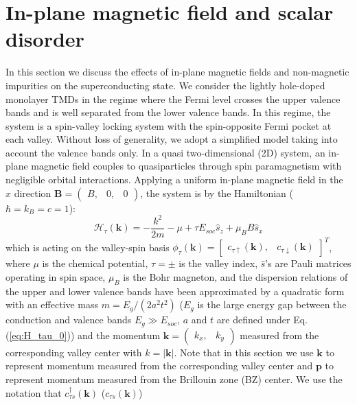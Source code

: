 \section{In-plane magnetic field and scalar disorder}

In this section we discuss the effects of in-plane magnetic fields
and non-magnetic impurities on the superconducting state. We consider
the lightly hole-doped monolayer TMDs in the regime where the Fermi
level crosses the upper valence bands and is well separated from the
lower valence bands. In this regime, the system is a spin-valley locking
system with the spin-opposite Fermi pocket at each valley. Without loss of generality, we adopt a simplified model taking
into account the valence bands only. In a quasi two-dimensional (2D)
system, an in-plane magnetic field couples to quasiparticles through
spin paramagnetism with negligible orbital interactions. Applying
a uniform in-plane magnetic field in the $x$ direction $\mathbf{B}=(\begin{array}{ccc}
B, & 0, & 0\end{array})$, the system is by the Hamiltonian ($\hbar=k_{B}=c=1$):
\begin{equation}
\mathcal{H}_{\tau}(\mathbf{k})=-\frac{k^{2}}{2m}-\mu+\tau E_{soc}\hat{s}_{z}+\mu_{B}B\hat{s}_{x}\label{eq: valley_Hamiltonian}
\end{equation}
which is acting on the valley-spin basis $\phi_{\tau}(\mathbf{k})=\left[\begin{array}{cc}
c_{\tau\uparrow}(\mathbf{k}), & c_{\tau\downarrow}(\mathbf{k})\end{array}\right]^{T}$, where $\mu$ is the chemical potential, $\tau=\pm$ is the valley
index, $\hat{s}$'s are Pauli matrices operating in spin space, $\mu_{B}$
is the Bohr magneton, and the dispersion relations of the upper and
lower valence bands have been approximated by a quadratic form with
an effective mass $m=E_{g}/\left(2a^{2}t^{2}\right)$ ($E_{g}$ is the large energy gap between the conduction and valence bands $E_{g}\gg E_{soc}$, $a$ and $t$ are defined under Eq. (\ref{eq:H_tau_0})) and the momentum $\mathbf{k}=\left(\begin{array}{cc}
k_{x}, & k_{y}\end{array}\right)$ measured from the corresponding valley center with $k=|\mathbf{k}|$.
Note that in this section we use $\mathbf{k}$ to represent momentum
measured from the corresponding valley center and $\mathbf{p}$ to
represent momentum measured from the Brillouin zone (BZ) center. We
use the notation that $c_{\tau s}^{\dagger}(\mathbf{k})$ ($c_{\tau s}(\mathbf{k})$)
